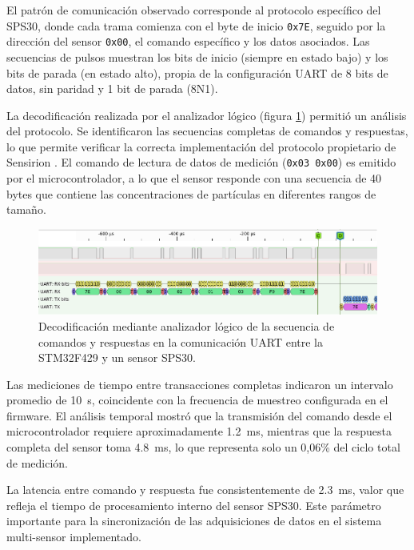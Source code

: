 El patrón de comunicación observado corresponde al protocolo específico del SPS30, donde cada trama comienza con el byte de inicio \texttt{0x7E}, seguido por la dirección del sensor \texttt{0x00}, el comando específico y los datos asociados. Las secuencias de pulsos muestran los bits de inicio (siempre en estado bajo) y los bits de parada (en estado alto), propia de la configuración UART de 8 bits de datos, sin paridad y 1 bit de parada (8N1).

La decodificación realizada por el analizador lógico (figura \ref{fig:senalanalizadorlogico}) permitió un análisis del protocolo. Se identificaron las secuencias completas de comandos y respuestas, lo que permite verificar la correcta implementación del protocolo propietario de Sensirion . El comando de lectura de datos de medición (\texttt{0x03 0x00}) es emitido por el microcontrolador, a lo que el sensor responde con una secuencia de 40 bytes que contiene las concentraciones de partículas en diferentes rangos de tamaño.

\begin{figure}[!hp]
	\centering
	\includegraphics[width=1\linewidth]{Figures/senal_analizador_logico}
	\caption{Decodificación mediante analizador lógico de la secuencia de comandos y respuestas en la comunicación UART entre la STM32F429 y un sensor SPS30. }
	\label{fig:senalanalizadorlogico}
\end{figure}

Las mediciones de tiempo entre transacciones completas indicaron un intervalo promedio de \SI{10}{\second}, coincidente con la frecuencia de muestreo configurada en el firmware. El análisis temporal mostró que la transmisión del comando desde el microcontrolador requiere aproximadamente \SI{1.2}{\milli\second}, mientras que la respuesta completa del sensor toma \SI{4.8}{\milli\second}, lo que representa solo un 0,06\% del ciclo total de medición. 

La latencia entre comando y respuesta fue consistentemente de \SI{2.3}{\milli\second}, valor que refleja el tiempo de procesamiento interno del sensor SPS30. Este parámetro importante para la sincronización de las adquisiciones de datos en el sistema multi-sensor implementado.


